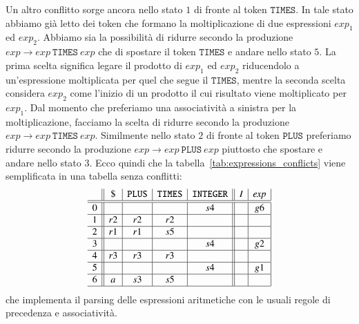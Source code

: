 Un altro conflitto sorge ancora nello stato $1$ di fronte al token
$\mathtt{TIMES}$. In tale stato abbiamo gi\`a letto dei token che formano
la moltiplicazione di due espressioni $\mathit{exp}_1$ ed $\mathit{exp}_2$.
Abbiamo sia la possibilit\`a di ridurre secondo la produzione
$\mathit{exp}\to\mathit{exp}\ \mathtt{TIMES}\ \mathit{exp}$ che
di spostare il token $\mathtt{TIMES}$
e andare nello stato $5$. La prima scelta significa
legare il prodotto di $\mathit{exp}_1$ ed $\mathit{exp}_2$
riducendolo a un'espressione moltiplicata per
quel che segue il $\mathtt{TIMES}$, mentre la seconda scelta considera
$\mathit{exp}_2$ come l'inizio di un prodotto il cui risultato
viene moltiplicato per $\mathit{exp}_1$. Dal momento che preferiamo una
associativit\`a a sinistra per la moltiplicazione, facciamo la scelta di
ridurre secondo la produzione
$\mathit{exp}\to\mathit{exp}\ \mathtt{TIMES}\ \mathit{exp}$.
Similmente nello stato $2$ di fronte al token $\mathtt{PLUS}$ preferiamo
ridurre secondo la produzione
$\mathit{exp}\to\mathit{exp}\ \mathtt{PLUS}\ \mathit{exp}$ piuttosto
che spostare e andare nello stato $3$. Ecco quindi che la
tabella~\eqref{tab:expressions_conflicts}
viene semplificata in una tabella senza conflitti:
%
\[
\begin{array}{c||c|c|c|c||c|c|}
  & \mathtt{\$} & \mathtt{PLUS} & \mathtt{TIMES} & \mathtt{INTEGER} & I  & \mathit{exp}\\\hline\hline
0 &             &     &     & s4   &    & g6 \\\hline
1 & r2          & r2 & r2 &      &    &    \\\hline
2 & r1          & r1 & s5 &      &    &    \\\hline
3 &             &     &     & s4   &    & g2 \\\hline
4 & r3          & r3  & r3  &      &    &    \\\hline
5 &             &     &     & s4   &    & g1 \\\hline
6 & a           & s3  & s5  &      &    &    \\\hline
\end{array}
\]
che implementa il parsing delle espressioni aritmetiche con le
usuali regole di precedenza e associativit\`a.

